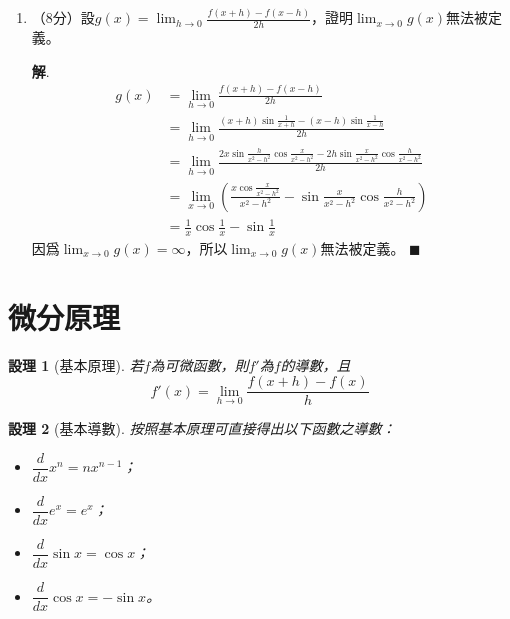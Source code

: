 \documentclass[12pt]{article}
\newtheorem*{proposition}{設理}
\newenvironment*{sol}{\par \textbf{解}.}{\hfill$\blacksquare$}
\begin{document}
\begin{enumerate}
\begin{enumerate}
\begin{sol}
\begin{align*}
                    &=\lim_{h\to 0}\frac{\sin{h}}{h}\\
                    &=1
                \end{align*}
            \end{sol}
            \item （8分）設$\displaystyle g(x)=\lim_{h\to 0}\frac{f(x+h)-f(x-h)}{2h}$，證明$\lim_{x\to 0}g(x)$無法被定義。\begin{sol}
                \begin{align*}
                    g(x)&=\lim_{h\to 0}\frac{f(x+h)-f(x-h)}{2h}\\
                    &=\lim_{h\to 0}\frac{(x+h)\sin{\frac{1}{x+h}}-(x-h)\sin{\frac{1}{x-h}}}{2h}\\
                    &=\lim_{h\to 0}\frac{2x\sin{\frac{h}{x^2-h^2}}\cos{\frac{x}{x^2-h^2}}-2h\sin{\frac{x}{x^2-h^2}}\cos{\frac{h}{x^2-h^2}}}{2h}\\
                    &=\lim_{x\to 0}(\frac{x\cos{\frac{x}{x^2-h^2}}}{x^2-h^2}-\sin{\frac{x}{x^2-h^2}}\cos{\frac{h}{x^2-h^2}})\\
                    &=\frac{1}{x}\cos{\frac{1}{x}}-\sin{\frac{1}{x}}
                \end{align*}
                因爲$\lim_{x\to 0}g(x)=\infty$，所以$\lim_{x\to 0}g(x)$無法被定義。
            \end{sol}
        \end{enumerate}
    \end{enumerate}

    \section*{微分原理}

    \begin{proposition}[基本原理]
        若$f$為可微函數，則$f'$為$f$的導數，且$$f'(x)=\lim_{h\to 0}\frac{f(x+h)-f(x)}{h}$$
    \end{proposition}

    \begin{proposition}[基本導數]
        按照基本原理可直接得出以下函數之導數：\begin{itemize}
            \item $\dfrac{d}{dx}x^n=nx^{n-1}$；
            \item $\dfrac{d}{dx}e^x=e^x$；
            \item $\dfrac{d}{dx}\sin{x}=\cos{x}$；
            \item $\dfrac{d}{dx}\cos{x}=-\sin{x}$。
        \end{itemize}
    \end{proposition}
\end{document}
